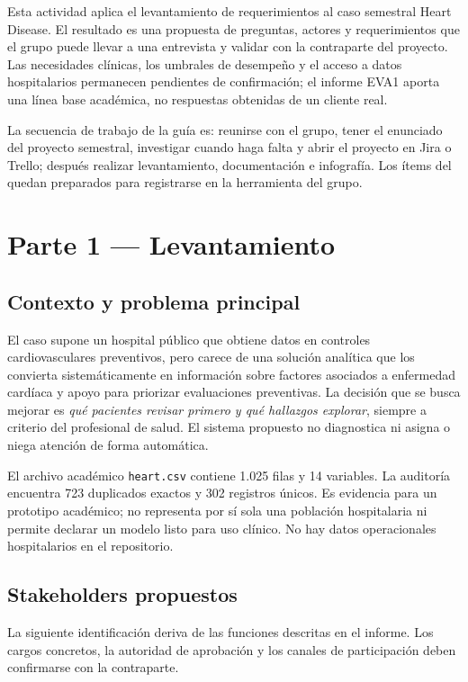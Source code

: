\documentclass[12pt,a4paper]{article}
\begin{document}
Esta actividad aplica el levantamiento de requerimientos al caso semestral Heart Disease. El resultado es una propuesta de preguntas, actores y requerimientos que el grupo puede llevar a una entrevista y validar con la contraparte del proyecto. Las necesidades clínicas, los umbrales de desempeño y el acceso a datos hospitalarios permanecen pendientes de confirmación; el informe EVA1 aporta una línea base académica, no respuestas obtenidas de un cliente real.

La secuencia de trabajo de la guía es: reunirse con el grupo, tener el enunciado del proyecto semestral, investigar cuando haga falta y abrir el proyecto en Jira o Trello; después realizar levantamiento, documentación e infografía. Los ítems del  quedan preparados para registrarse en la herramienta del grupo.

\section{Parte 1 --- Levantamiento}

\subsection{Contexto y problema principal}

El caso supone un hospital público que obtiene datos en controles cardiovasculares preventivos, pero carece de una solución analítica que los convierta sistemáticamente en información sobre factores asociados a enfermedad cardíaca y apoyo para priorizar evaluaciones preventivas. La decisión que se busca mejorar es \emph{qué pacientes revisar primero y qué hallazgos explorar}, siempre a criterio del profesional de salud. El sistema propuesto no diagnostica ni asigna o niega atención de forma automática.

El archivo académico \texttt{heart.csv} contiene 1.025 filas y 14 variables. La auditoría encuentra 723 duplicados exactos y 302 registros únicos. Es evidencia para un prototipo académico; no representa por sí sola una población hospitalaria ni permite declarar un modelo listo para uso clínico. No hay datos operacionales hospitalarios en el repositorio.

\subsection{Stakeholders propuestos}

La siguiente identificación deriva de las funciones descritas en el informe. Los cargos concretos, la autoridad de aprobación y los canales de participación deben confirmarse con la contraparte.
\end{document}
